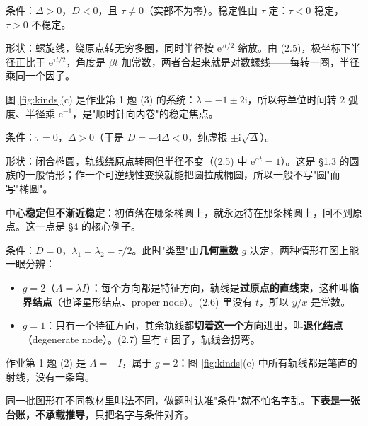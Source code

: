 \documentclass[11pt]{ctexart}
\begin{document}

条件：$\Delta>0$，$D<0$，且 $\tau\neq0$（实部不为零）。稳定性由 $\tau$ 定：$\tau<0$ 稳定，$\tau>0$ 不稳定。

形状：螺旋线，绕原点转无穷多圈，同时半径按 $\mathrm{e}^{\tau t/2}$ 缩放。由 (2.5)，极坐标下半径正比于 $\mathrm{e}^{\tau t/2}$，角度是 $\beta t$ 加常数，两者合起来就是对数螺线——每转一圈，半径乘同一个因子。

图 \ref{fig:kinds}(c) 是作业第 1 题 (3) 的系统：$\lambda=-1\pm2\mathrm{i}$，所以每单位时间转 $2$ 弧度、半径乘 $\mathrm{e}^{-1}$，是"顺时针向内卷"的稳定焦点。


条件：$\tau=0$，$\Delta>0$（于是 $D=-4\Delta<0$，纯虚根 $\pm\mathrm{i}\sqrt{\Delta}$）。

形状：闭合椭圆，轨线绕原点转圈但半径不变（(2.5) 中 $\mathrm{e}^{\alpha t}=1$）。这是 §1.3 的圆族的一般情形；作一个可逆线性变换就能把圆拉成椭圆，所以一般不写"圆"而写"椭圆"。

中心\textbf{稳定但不渐近稳定}：初值落在哪条椭圆上，就永远待在那条椭圆上，回不到原点。这一点是 §4 的核心例子。


条件：$D=0$，$\lambda_1=\lambda_2=\tau/2$。此时"类型"由\textbf{几何重数} $g$ 决定，两种情形在图上能一眼分辨：

\begin{itemize}
\item $g=2$（$A=\lambda I$）：每个方向都是特征方向，轨线是\textbf{过原点的直线束}，这种叫\textbf{临界结点}（也译星形结点、proper node）。(2.6) 里没有 $t$，所以 $y/x$ 是常数。
\item $g=1$：只有一个特征方向，其余轨线都\textbf{切着这一个方向}进出，叫\textbf{退化结点}（degenerate node）。(2.7) 里有 $t$ 因子，轨线会拐弯。
\end{itemize}

作业第 1 题 (2) 是 $A=-I$，属于 $g=2$：图 \ref{fig:kinds}(e) 中所有轨线都是笔直的射线，没有一条弯。


同一批图形在不同教材里叫法不同，做题时认准"条件"就不怕名字乱。\textbf{下表是一张台账，不承载推导}，只把名字与条件对齐。
\end{document}
